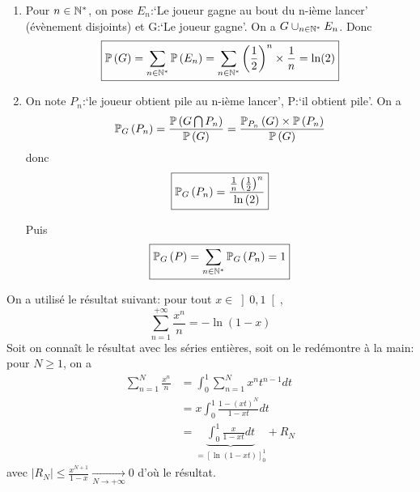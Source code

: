 \begin{solution}
    \phantom{}
    \begin{enumerate}
        \item Pour $n\in\N^{*}$, on pose $E_{n}$:`Le joueur gagne au bout du n-ième lancer' (évènement disjoints) et G:`Le joueur gagne'. On a $G\cup_{n\in\N^{*}}E_{n}$. Donc 
        \begin{equation}
            \boxed{\P\left(G\right)=\sum_{n\in\N^{*}}\P\left(E_{n}\right)=\sum_{n\in\N^{*}}\left(\frac{1}{2}\right)^{n}\times\frac{1}{n}=\ln(2)}
        \end{equation}

        \item On note $P_{n}$:`le joueur obtient pile au n-ième lancer', P:`il obtient pile'. On a 
        \begin{equation}
            \P_{G}\left(P_{n}\right)=\frac{\P\left(G\bigcap P_{n}\right)}{\P\left(G\right)}=\frac{\P_{P_{n}}\left(G\right)\times\P\left(P_{n}\right)}{\P\left(G\right)}
        \end{equation}
        donc 
        \begin{equation}
            \boxed{\P_{G}\left(P_{n}\right)=\frac{\frac{1}{n}\left(\frac{1}{2}    \right)^{n}}{\ln\left(2\right)}}
        \end{equation}

        Puis 
        \begin{equation}
            \boxed{\P_{G}\left(P\right)=\sum_{n\in\N^{*}}\P_{G}\left(P_{n}\right)=1}
        \end{equation}
    \end{enumerate}
\end{solution}

\begin{remark}
    On a utilisé le résultat suivant: pour tout $x\in\left]0,1\right[$, 
    \begin{equation}
        \sum_{n=1}^{+\infty}\frac{x^{n}}{n}=-\ln\left(1-x\right)
    \end{equation}
    Soit on connaît le résultat avec les séries entières, soit on le redémontre à la main: pour $N\geqslant1$, on a 
    \begin{align}
        \sum_{n=1}^{N}\frac{x^{n}}{n}
        &=\int_{0}^{1}\sum_{n=1}^{N}x^{n}t^{n-1}dt\\
        &=x\int_{0}^{1}\frac{1-\left(xt\right)^{N}}{1-xt}dt\\
        &=\underbrace{\int_{0}^{1}\frac{x}{1-xt}dt}_{=\left[\ln\left(1-xt\right)\right]_{0}^{1}}+R_{N}
    \end{align}
    avec $\left\lvert R_{N}\right\rvert\leqslant\frac{x^{N+1}}{1-x}\xrightarrow[N\to+\infty]{}0$ d'où le résultat.
\end{remark}

